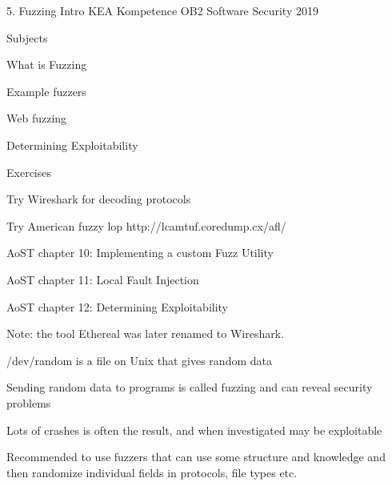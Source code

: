 \documentclass[Screen16to9,17pt]{foils}
\begin{document}
\mytitlepage
{5. Fuzzing Intro}
{KEA Kompetence OB2 Software Security 2019}


\begin{list1}
\item Subjects
\begin{list2}
\item What is Fuzzing
\item Example fuzzers
\item Web fuzzing
\item Determining Exploitability
\end{list2}
\item Exercises
\begin{list2}
\item Try Wireshark for decoding protocols
\item Try American fuzzy lop http://lcamtuf.coredump.cx/afl/
\end{list2}
\end{list1}


\begin{list1}
\item AoST chapter 10: Implementing a custom Fuzz Utility
\item AoST chapter 11: Local Fault Injection
\item AoST chapter 12: Determining Exploitability
\end{list1}

Note: the tool Ethereal was later renamed to Wireshark.



\begin{list1}
\item /dev/random is a file on Unix that gives random data
\item Sending random data to programs is called fuzzing and can reveal security problems
\item Lots of crashes is often the result, and when investigated may be exploitable
\item Recommended to use fuzzers that can use some structure and knowledge and then randomize individual fields in protocols, file types etc.
\end{list1}

\end{document}
